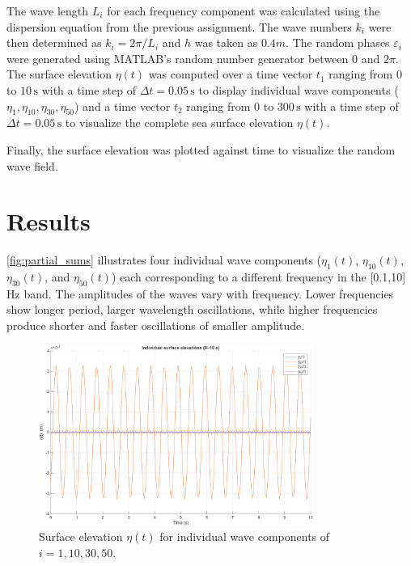 \documentclass[a4paper, 11pt]{article}
\begin{document}
The wave length $L_i$ for each frequency component was calculated using the  dispersion equation from the previous assignment. The wave numbers $k_i$ were then determined as $k_i = 2\pi / L_i$ and $h$ was taken as $0.4 m$. The random phases $\varepsilon_i$ were generated using MATLAB's random number generator between 0 and $2\pi$. The surface elevation $\eta(t)$ was computed over a time vector $t_1$ ranging from $0$ to $10\,\mathrm{s}$ with a time step of $\Delta t = 0.05\,\mathrm{s}$ to display individual wave components ($\eta_1, \eta_{10}, \eta_{30}, \eta_{50}$) and a time vector $t_2$ ranging from $0$ to $300\,\mathrm{s}$ with a time step of $\Delta t = 0.05\,\mathrm{s}$ to visualize the complete sea surface elevation $\eta(t)$. 

Finally, the surface elevation was plotted against time to visualize the random wave field.

\section{Results}

\hspace{0.5cm}\autoref{fig:partial_sums} illustrates four individual wave components ($\eta_1(t)$, $\eta_{10}(t)$, $\eta_{30}(t)$, and $\eta_{50}(t)$) each corresponding to a different frequency in the [0.1,10] Hz band. The amplitudes of the waves vary with frequency. Lower frequencies show longer period, larger wavelength oscillations, while higher frequencies produce shorter and faster oscillations of smaller amplitude. 

\begin{figure}[H]
\centering
\includegraphics[width=0.8\textwidth]{partial_sums.png}
\caption{Surface elevation $\eta(t)$ for individual wave components of $i = 1, 10, 30, 50$.}
\label{fig:partial_sums}
\end{figure}
\end{document}
